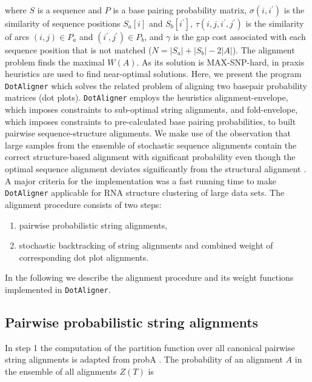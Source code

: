 \documentclass[a4paper,twoside]{article}
\newcommand\dotaligner{\texttt{DotAligner}}
\begin{document}
where $S$ is a sequence and $P$ is a base pairing probability matrix,
$\sigma(i,i^\prime)$ is the similarity of sequence positions $S_a[i]$ and
$S_b[i^\prime]$, $\tau(i,j,i^\prime,j^\prime)$ is the similarity of arcs $(i,j)
\in P_a$ and $(i^\prime,j^\prime) \in P_b$,
and $\gamma$ is the gap cost associated with each sequence position that is not
matched ($N = |S_a|+|S_b|-2|A|$). The alignment problem finds the maximal
$W(A)$. As its solution is MAX-SNP-hard, in praxis heuristics are used to find
near-optimal solutions. Here, we present the program \dotaligner{} which solves
the related problem of aligning two basepair probability matrices (dot plots).
\dotaligner{} employs the heuristics alignment-envelope, which imposes
constraints to sub-optimal string alignments, and fold-envelope, which imposes
constraints to pre-calculated base pairing probabilities, to built
pairwise sequence-structure alignments. We make use of the observation that large
samples from the ensemble of stochastic sequence alignments contain the correct
structure-based alignment with significant probability even though the optimal
sequence alignment deviates significantly from the structural alignment
\cite{Muckstein12385998}. A major criteria for the implementation was a fast
running time to make \dotaligner{} applicable for RNA structure clustering of
large data sets. The alignment procedure consists of two steps:

\begin{enumerate}
  \item pairwise probabilistic string alignments,
  \item stochastic backtracking of string alignments and combined
	  weight of corresponding dot plot alignments.
\end{enumerate}

In the following we describe the alignment procedure and its weight functions
implemented in \dotaligner{}.


\subsection{Pairwise probabilistic string alignments}

In step 1 the computation of the partition function over all canonical pairwise
string alignments is adapted from probA \cite{Muckstein12385998}. The
probability of an alignment $A$ in the ensemble of all alignments $Z(T)$ is
\end{document}
